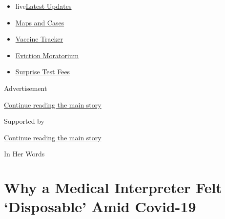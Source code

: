 \begin{itemize}
\tightlist
\item
  live\href{https://www.nytimes3xbfgragh.onion/2020/09/09/world/covid-19-coronavirus.html?name=styln-coronavirus-national\&region=TOP_BANNER\&block=storyline_menu_recirc\&action=click\&pgtype=Article\&impression_id=6b8ad081-f2c5-11ea-bc20-931b35b979be\&variant=undefined}{Latest
  Updates}
\item
  \href{https://www.nytimes3xbfgragh.onion/interactive/2020/us/coronavirus-us-cases.html?name=styln-coronavirus-national\&region=TOP_BANNER\&block=storyline_menu_recirc\&action=click\&pgtype=Article\&impression_id=6b8af790-f2c5-11ea-bc20-931b35b979be\&variant=undefined}{Maps
  and Cases}
\item
  \href{https://www.nytimes3xbfgragh.onion/interactive/2020/science/coronavirus-vaccine-tracker.html?name=styln-coronavirus-national\&region=TOP_BANNER\&block=storyline_menu_recirc\&action=click\&pgtype=Article\&impression_id=6b8af791-f2c5-11ea-bc20-931b35b979be\&variant=undefined}{Vaccine
  Tracker}
\item
  \href{https://www.nytimes3xbfgragh.onion/2020/09/02/your-money/eviction-moratorium-covid.html?name=styln-coronavirus-national\&region=TOP_BANNER\&block=storyline_menu_recirc\&action=click\&pgtype=Article\&impression_id=6b8af792-f2c5-11ea-bc20-931b35b979be\&variant=undefined}{Eviction
  Moratorium}
\item
  \href{https://www.nytimes3xbfgragh.onion/2020/09/09/upshot/coronavirus-surprise-test-fees.html?name=styln-coronavirus-national\&region=TOP_BANNER\&block=storyline_menu_recirc\&action=click\&pgtype=Article\&impression_id=6b8af793-f2c5-11ea-bc20-931b35b979be\&variant=undefined}{Surprise
  Test Fees}
\end{itemize}

Advertisement

\protect\hyperlink{after-top}{Continue reading the main story}

Supported by

\protect\hyperlink{after-sponsor}{Continue reading the main story}

In Her Words

\hypertarget{why-a-medical-interpreter-felt-disposable-amid-covid-19}{%
\section{Why a Medical Interpreter Felt `Disposable' Amid
Covid-19}\label{why-a-medical-interpreter-felt-disposable-amid-covid-19}}

